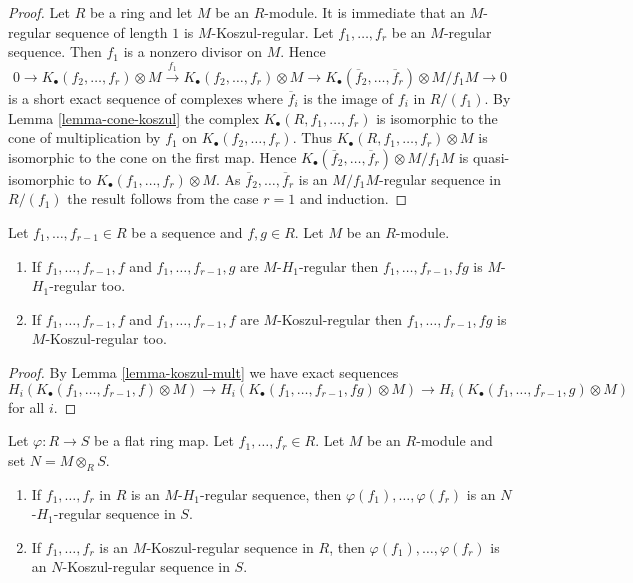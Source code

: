 \begin{proof}
Let $R$ be a ring and let $M$ be an $R$-module.
It is immediate that an $M$-regular sequence of length $1$ is
$M$-Koszul-regular.
Let $f_1, \ldots, f_r$ be an $M$-regular sequence.
Then $f_1$ is a nonzero divisor on $M$. Hence
$$
0 \to K_\bullet(f_2, \ldots, f_r) \otimes M
\xrightarrow{f_1}
K_\bullet(f_2, \ldots, f_r) \otimes M \to
K_\bullet(\overline{f}_2, \ldots, \overline{f}_r) \otimes M/f_1M \to 0
$$
is a short exact sequence of complexes where $\overline{f}_i$
is the image of $f_i$ in $R/(f_1)$. By
Lemma \ref{lemma-cone-koszul}
the complex $K_\bullet(R, f_1, \ldots, f_r)$
is isomorphic to the cone of multiplication by $f_1$
on $K_\bullet(f_2, \ldots, f_r)$. Thus
$K_\bullet(R, f_1, \ldots, f_r) \otimes M$ is isomorphic
to the cone on the first map. Hence
$K_\bullet(\overline{f}_2, \ldots, \overline{f}_r) \otimes M/f_1M$
is quasi-isomorphic to $K_\bullet(f_1, \ldots, f_r) \otimes M$.
As $\overline{f}_2, \ldots, \overline{f}_r$ is an $M/f_1M$-regular sequence
in $R/(f_1)$ the result follows from the case $r = 1$ and induction.
\end{proof}

\begin{lemma}
\label{lemma-mult-koszul-regular}
Let $f_1, \ldots, f_{r - 1} \in R$ be a sequence and $f, g \in R$.
Let $M$ be an $R$-module.
\begin{enumerate}
\item If $f_1, \ldots, f_{r - 1}, f$ and $f_1, \ldots, f_{r - 1}, g$
are $M$-$H_1$-regular then $f_1, \ldots, f_{r - 1}, fg$ is
$M$-$H_1$-regular too.
\item If $f_1, \ldots, f_{r - 1}, f$ and $f_1, \ldots, f_{r - 1}, f$ are
$M$-Koszul-regular then $f_1, \ldots, f_{r - 1}, fg$ is $M$-Koszul-regular
too.
\end{enumerate}
\end{lemma}

\begin{proof}
By
Lemma \ref{lemma-koszul-mult}
we have exact sequences
$$
H_i(K_\bullet(f_1, \ldots, f_{r - 1}, f) \otimes M) \to
H_i(K_\bullet(f_1, \ldots, f_{r - 1}, fg) \otimes M) \to
H_i(K_\bullet(f_1, \ldots, f_{r - 1}, g) \otimes M)
$$
for all $i$.
\end{proof}

\begin{lemma}
\label{lemma-koszul-regular-flat-base-change}
Let $\varphi : R \to S$ be a flat ring map. Let $f_1, \ldots, f_r \in R$.
Let $M$ be an $R$-module and set $N = M \otimes_R S$.
\begin{enumerate}
\item If $f_1, \ldots, f_r$ in $R$ is an $M$-$H_1$-regular sequence, then
$\varphi(f_1), \ldots, \varphi(f_r)$ is an $N$-$H_1$-regular
sequence in $S$.
\item If $f_1, \ldots, f_r$ is an $M$-Koszul-regular sequence in $R$, then
$\varphi(f_1), \ldots, \varphi(f_r)$ is an $N$-Koszul-regular
sequence in $S$.
\end{enumerate}
\end{lemma}

